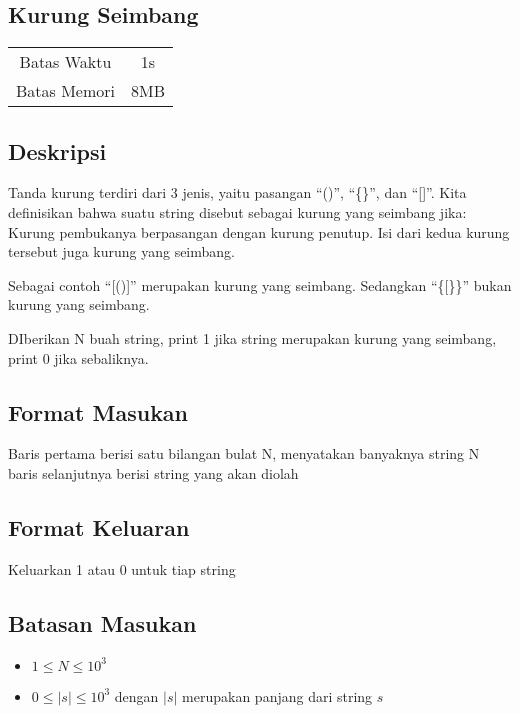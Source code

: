\documentclass{article}
\begin{document}
\begin{center}
    \section*{Kurung Seimbang} %

    \begin{tabular}{ | c c | }
        \hline
        Batas Waktu  & 1s \\    %
        Batas Memori & 8MB \\  %
        \hline
    \end{tabular}
\end{center}

\subsection*{Deskripsi}
Tanda kurung terdiri dari 3 jenis, yaitu pasangan “()”, “\{\}”, dan “[]”. Kita definisikan bahwa suatu string disebut sebagai kurung yang seimbang jika:
Kurung pembukanya berpasangan dengan kurung penutup.
Isi dari kedua kurung tersebut juga kurung yang seimbang.

Sebagai contoh “[()]” merupakan kurung yang seimbang. Sedangkan “\{[\}\}” bukan kurung yang seimbang.

DIberikan N buah string, print 1 jika string merupakan kurung yang seimbang, print 0 jika sebaliknya.


\subsection*{Format Masukan}
Baris pertama berisi satu bilangan bulat N, menyatakan banyaknya string
N baris selanjutnya berisi string yang akan diolah



\subsection*{Format Keluaran}
Keluarkan 1 atau 0 untuk tiap string
\subsection*{Batasan Masukan}
\begin{itemize}
 \item $1 \leq N  \leq 10^3$
 \item $0 \leq |s|  \leq 10^{3}$ dengan $|s|$ merupakan panjang dari string $s$
\end{itemize}
\end{document}
